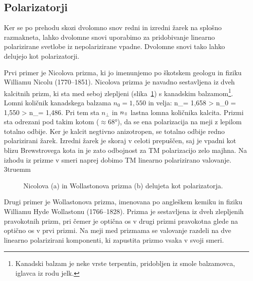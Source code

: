 \subsection*{Polarizatorji}
Ker se po prehodu skozi dvolomno snov redni in izredni žarek na splošno razmakneta, 
lahko dvolomne snovi uporabimo za pridobivanje linearno polarizirane svetlobe iz nepolarizirane
vpadne. Dvolomne snovi tako lahko delujejo kot polarizatorji.

Prvi primer je Nicolova prizma, ki jo imenunjemo po škotskem geologu in fiziku
Williamu Nicolu (1770--1851). Nicolova prizma je navadno sestavljena iz dveh kalcitnih prizm, ki 
sta med seboj zlepljeni (slika~\ref{fig:10_Nicol}) s kanadskim balzamom\footnote{Kanadski balzam je neke vrste 
terpentin, pridobljen iz smole balzamovca, iglavca iz rodu jelk.}. 
Lomni količnik kanadskega balzama $n_0=1,550$ in velja:
\beq
n_\perp = 1,658 > n_0 = 1,550 > n_\myparallel = 1,486.
\label{eq:10_119}
\eeq
Pri tem sta $n_\perp$ in $n_\myparallel$ lastna lomna količnika kalcita. 
Prizmi sta odrezani pod takim kotom ($\approx 68\si{\degree}$), da se ena polarizacija na 
meji z lepilom totalno odbije. Ker je kalcit negtivno anizotropen, se totalno odbije redno polarizirani
žarek. Izredni žarek je skoraj v celoti prepuščen, saj je vpadni kot blizu Brewstrovega kota in je zato
odbojnost za TM polarizacijo zelo majhna. Na izhodu iz prizme v smeri naprej dobimo 
TM linearno polarizirano valovanje.
\vglue3truemm
\begin{figure}[!h]
\centering
\def\svgwidth{130truemm} 

\caption{Nicolova (a) in Wollastonova prizma (b) delujeta kot polarizatorja.}
\label{fig:10_Nicol}
\end{figure}

Drugi primer je Wollastonova prizma, imenovana po angleškem kemiku in fiziku 
Williamu Hyde Wollastonu (1766--1828). Prizma je sestavljena iz dveh zlepljenih pravokotnih prizm, 
pri čemer je optična os v drugi prizmi pravokotna glede na optično os v prvi prizmi. 
Na meji med prizmama se valovanje razdeli na dve linearno polarizirani komponenti, 
ki zapustita prizmo vsaka v svoji smeri. 

